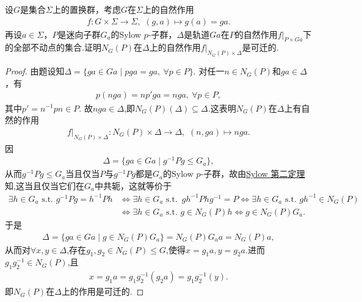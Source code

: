 \documentclass[../../main.tex]{subfiles}%
\begin{document}
\begin{example}
设$G$是集合$\Sigma$上的置换群，考虑$G$在$\Sigma$上的自然作用
\begin{align*}
f: G\times \Sigma\to \Sigma,\,\,(g,a)\mapsto g(a)=ga.
\end{align*}
再设$a\in\Sigma$，$P$是迷向子群$G_a$的Sylow $p$-子群，$\Delta$是轨道$Ga$在$P$的自然作用$f|_{P\times Ga}$下的全部不动点的集合.证明$N_G(P)$在$\Delta$上的自然作用$f|_{N_G(P)\times \Delta}$是可迁的.
\end{example}
\begin{proof}

由题设知$\Delta = \{ga\in Ga \mid pga = ga,\ \forall p\in P\}$. 对任一$n\in N_G(P)$和$ga\in\Delta$，有
\begin{align*}
p(nga) = np'ga = nga,\ \forall p\in P,
\end{align*}
其中$p' = n^{-1}pn\in P$. 故$nga\in \Delta$,即$N_G(P)(\Delta)\subseteq \Delta$.这表明$N_G(P)$在$\Delta$上有自然的作用
\begin{align*}
f|_{N_G(P)\times \Delta}:N_G(P)\times \Delta\to \Delta,\,\,(n,ga)\mapsto nga.
\end{align*}
因
\begin{align*}
\Delta = \{ga\in Ga \mid g^{-1}Pg \leqslant G_a\},
\end{align*}
从而$g^{-1}Pg \leqslant G_a$当且仅当$P$与$g^{-1}Pg$都是$G_a$的Sylow $p$-子群，故由\hyperref[theorem:Sylow 第二定理]{Sylow 第二定理}知,这当且仅当它们在$G_a$中共轭，这就等价于
\begin{align*}
\exists h\in G_a\,\,\mathrm{s}.\mathrm{t}.\,\,g^{-1}Pg=h^{-1}Ph&\Longleftrightarrow \exists h\in G_a\,\,\mathrm{s}.\mathrm{t}.\,\,\,gh^{-1}Phg^{-1}=P\Longleftrightarrow \exists h\in G_a\,\,\mathrm{s}.\mathrm{t}.\,\,gh^{-1}\in N_G(P)
\\
&\Longleftrightarrow \exists h\in G_a\,\,\mathrm{s}.\mathrm{t}.\,\,g\in N_G(P)h\Longleftrightarrow g\in N_G(P)G_a.
\end{align*}
于是
\begin{align*}
\Delta = \{ga\in Ga \mid g\in N_G(P)G_a\} = N_G(P)G_a a = N_G(P)a,
\end{align*}
从而对$\forall x,y\in \Delta$,存在$g_1,g_2\in N_G(P)\leqslant G$,使得$x=g_1a,y=g_2a$.进而$g_1g_2^{-1}\in N_G(P)$,且
\begin{align*}
x=g_1a=g_1g_2^{-1}(g_2a)=g_1g_2^{-1}(y).
\end{align*}
即$N_G(P)$在$\Delta$上的作用是可迁的.

\end{proof}
\end{document}
